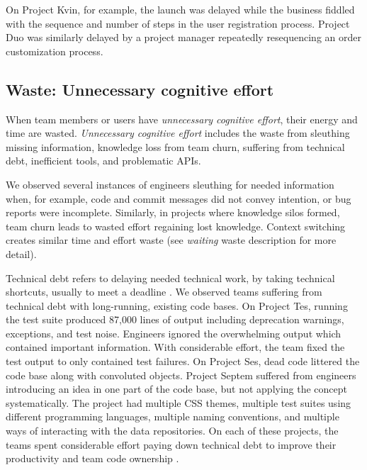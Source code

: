 On Project Kvin, for example, the launch was delayed while the business fiddled with the sequence and number of steps in the user registration process. Project Duo was similarly delayed by a project manager repeatedly resequencing an order customization process. 



\subsection{Waste: Unnecessary cognitive effort}
When team members or users have \textit{unnecessary cognitive effort}, their energy and time are wasted. \textit{Unnecessary cognitive effort} includes the waste from sleuthing missing information, knowledge loss from team churn, suffering from technical debt, inefficient tools, and problematic APIs.

We observed several instances of engineers sleuthing for needed information when, for example, code and commit messages did not convey intention, or bug reports were incomplete. Similarly, in projects where knowledge silos formed, team churn leads to wasted effort regaining lost knowledge. Context switching creates similar time and effort waste (see \textit{waiting} waste description for more detail). 
 
Technical debt refers to delaying needed technical work, by taking technical shortcuts, usually to meet a deadline \cite{McConnellTechnicalDebt}. We observed teams suffering from technical debt with long-running, existing code bases. On Project Tes, running the test suite produced 87,000 lines of output including deprecation warnings, exceptions, and test noise. Engineers ignored the overwhelming output which contained important information. With considerable effort, the team fixed the test output to only contained test failures. On Project Ses, dead code littered the code base along with convoluted objects. Project Septem suffered from engineers introducing an idea in one part of the code base, but not applying the concept systematically. The project had multiple CSS themes, multiple test suites using different programming languages, multiple naming conventions, and multiple ways of interacting with the data repositories. On each of these projects, the teams spent considerable effort paying down technical debt to improve their productivity and team code ownership \cite{SedanoTeamCodeOwnership}.  

